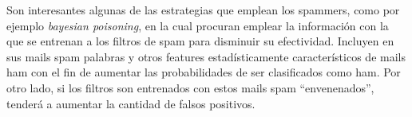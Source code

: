 \documentclass[10pt,a4paper]{article}
\begin{document}
Son interesantes algunas de las estrategias que emplean los spammers, como por ejemplo \emph{bayesian poisoning}, en la cual procuran emplear la información con la que se entrenan a los filtros de spam para disminuir su efectividad. Incluyen en sus mails spam palabras y otros features estadísticamente característicos de mails ham con el fin de aumentar las probabilidades de ser clasificados como ham. Por otro lado, si los filtros son entrenados con estos mails spam ``envenenados'', tenderá a aumentar la cantidad de falsos positivos.

%
%
%
%
%

\end{document}
